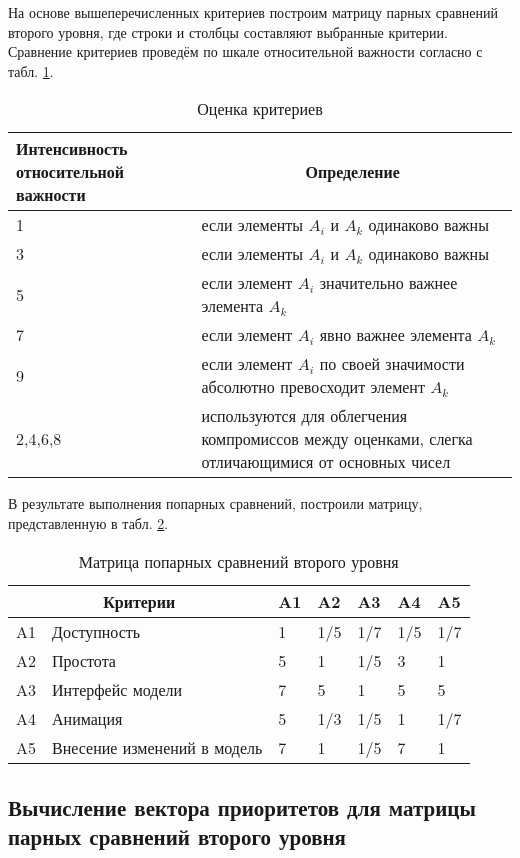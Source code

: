 На основе вышеперечисленных критериев построим матрицу парных сравнений второго уровня, где строки и столбцы составляют выбранные критерии.
Сравнение критериев проведём по шкале относительной важности согласно с табл. \ref{crit}.
\begin{table}[H]
  \caption{Оценка критериев}\label{crit}
  \begin{tabular}{|p{4cm}|p{12cm}|}
  \hline Интенсивность относительной важности & \multicolumn{1}{|c|}{Определение} \\
  \hline 1 & если элементы $A_i$ и $A_k$ одинаково важны \\
  \hline 3 & если элементы $A_i$ и $A_k$ одинаково важны \\
  \hline 5 & если элемент $A_i$ значительно важнее элемента $A_k$ \\
  \hline 7 & если элемент $A_i$ явно важнее элемента $A_k$ \\
  \hline 9 & если элемент $A_i$ по своей значимости абсолютно превосходит элемент $A_k$ \\
  \hline 2,4,6,8 & используются для облегчения компромиссов между оценками, слегка отличающимися от основных чисел \\
  \hline
  \end{tabular}
\end{table}

В результате выполнения попарных сравнений, построили матрицу, представленную в табл. \ref{matrix}.
\begin{table}[H]
  \caption{Матрица попарных сравнений второго уровня}\label{matrix}
  \begin{tabular}{|p{0.6cm}|p{8cm}|l|l|l|l|l|}
  \hline \multicolumn{2}{|c|}{Критерии} & A1 & A2 & A3 & A4 & A5 \\
  \hline A1 & Доступность & 1 & 1/5 & 1/7 & 1/5 & 1/7 \\
  \hline A2 & Простота & 5 & 1 & 1/5 & 3 & 1 \\
  \hline A3 & Интерфейс модели & 7 & 5 & 1 & 5 & 5 \\
  \hline A4 & Анимация & 5 & 1/3 & 1/5 & 1 & 1/7 \\
  \hline A5 & Внесение изменений в модель & 7 & 1 & 1/5 & 7 & 1 \\
  \hline
  \end{tabular}
\end{table}

\subsection{Вычисление вектора приоритетов для матрицы парных сравнений второго уровня}

